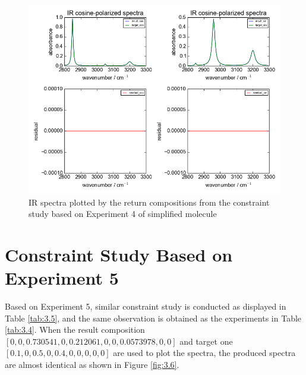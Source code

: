 \begin{figure}[!ht] 
\centering
\includegraphics[scale=0.7]{Figures/toy_model_result_plotting_ir_sin_4candi_constraint_study_experiment4.png} 
\caption{IR spectra plotted by the return compositions from the constraint study based on Experiment 4 of simplified molecule}\label{fig:3.5}
\end{figure}


\section{Constraint Study Based on Experiment 5}

Based on Experiment 5, similar constraint study is conducted as displayed in Table \ref{tab:3.5}, and the same observation is obtained as the experiments in Table \ref{tab:3.4}. When the result composition $[0, 0, 0.730541, 0, 0.212061,0, 0, 0.0573978, 0, 0]$ and target one $[0.1, 0, 0.5, 0, 0.4, 0, 0, 0, 0, 0]$ are used to plot the spectra, the produced spectra are almost identical as shown in Figure \ref{fig:3.6}.

